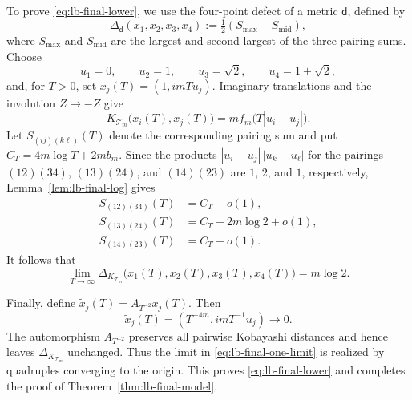 \documentclass[11pt]{article}
\theoremstyle{definition}
\begin{document}
To prove \eqref{eq:lb-final-lower}, we use the four-point defect
of a metric \(\mathsf d\), defined by
\[
\Delta_{\mathsf d}(x_1,x_2,x_3,x_4)
:=\tfrac12(S_{\max}-S_{\mathrm{mid}}),
\]
where $S_{\max}$ and $S_{\mathrm{mid}}$ are the largest and second largest of
the three pairing sums. Choose
\[
 u_1=0,
 \qquad u_2=1,
 \qquad u_3=\sqrt2,
 \qquad u_4=1+\sqrt2,
\]
and, for $T>0$, set $x_j(T)=(1,imTu_j)$. Imaginary translations and the
involution $Z\mapsto-Z$ give
\[
 K_{\mathcal T_m}\bigl(x_i(T),x_j(T)\bigr)
 =mf_m\bigl(T|u_i-u_j|\bigr).
\]
Let $S_{(ij)(k\ell)}(T)$ denote the corresponding pairing sum and put
$C_T=4m\log T+2mb_m$. Since the products
$|u_i-u_j|\,|u_k-u_\ell|$ for the pairings $(12)(34)$, $(13)(24)$, and
$(14)(23)$ are $1$, $2$, and $1$, respectively,
Lemma~\ref{lem:lb-final-log} gives
\[
 \begin{aligned}
 S_{(12)(34)}(T)&=C_T+o(1),\\
 S_{(13)(24)}(T)&=C_T+2m\log2+o(1),\\
 S_{(14)(23)}(T)&=C_T+o(1).
 \end{aligned}
\]
It follows that
\begin{equation}\label{eq:lb-final-one-limit}
 \lim_{T\to\infty}
 \Delta_{K_{\mathcal T_m}}
 \bigl(x_1(T),x_2(T),x_3(T),x_4(T)\bigr)
 =m\log2.
\end{equation}

Finally, define $\widetilde x_j(T)=A_{T^{-2}}x_j(T)$. Then
\begin{equation}\label{eq:lb-final-local-witnesses}
 \widetilde x_j(T)
 =(T^{-4m},imT^{-1}u_j)\longrightarrow0.
\end{equation}
The automorphism $A_{T^{-2}}$ preserves all pairwise Kobayashi distances and
hence leaves $\Delta_{K_{\mathcal T_m}}$ unchanged. Thus the limit in
\eqref{eq:lb-final-one-limit} is realized by quadruples converging to the
origin. This proves \eqref{eq:lb-final-lower} and completes the proof of
Theorem~\ref{thm:lb-final-model}.
\end{document}

